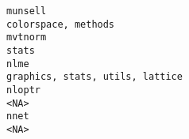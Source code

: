 \documentclass[
  letterpaper,
  DIV=11,
  numbers=noendperiod]{scrreprt}
\begin{document}
\begin{verbatim}
munsell                                                                                                                                                                                                                                                                                                                                                                                                                                                                                                                                                                                                colorspace, methods
mvtnorm                                                                                                                                                                                                                                                                                                                                                                                                                                                                                                                                                                                                              stats
nlme                                                                                                                                                                                                                                                                                                                                                                                                                                                                                                                                                                                       graphics, stats, utils, lattice
nloptr                                                                                                                                                                                                                                                                                                                                                                                                                                                                                                                                                                                                                <NA>
nnet                                                                                                                                                                                                                                                                                                                                                                                                                                                                                                                                                                                                                  <NA>

\end{verbatim}
\end{document}
